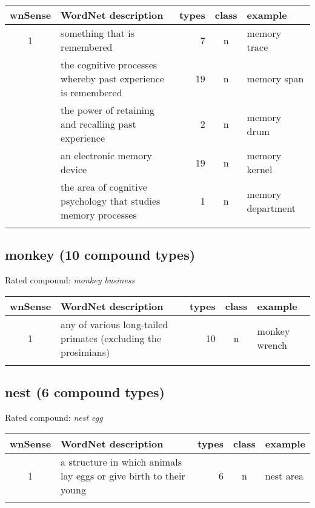 \noindent
\begin{longtable}{c>{\raggedright\arraybackslash}p{5cm}rc>{\raggedright\arraybackslash}p{2cm}}\lsptoprule
{\small wnSense}&WordNet description&types&class&example\\\midrule
1&something that is remembered&7&n&memory trace\\\tablevspace
2&the cognitive processes whereby past experience is
remembered&19&n&memory span\\\tablevspace
3&the power of retaining and recalling past experience&2&n&memory drum\\\tablevspace
4&an electronic memory device&19&n&memory kernel\\\tablevspace
5&the area of cognitive psychology that studies memory
processes&1&n&memory department\\\lspbottomrule
\end{longtable}

\subsection{monkey      (10 compound types)}
Rated compound: \emph{monkey business}

\vspace*{1ex}

\noindent
\begin{longtable}{c>{\raggedright\arraybackslash}p{5cm}rc>{\raggedright\arraybackslash}p{2cm}}\lsptoprule
{\small wnSense}&WordNet description&types&class&example\\\midrule
1&any of various long-tailed primates (excluding the prosimians)&10&n&monkey wrench\\\lspbottomrule
\end{longtable}

\subsection{nest         (6 compound types)}
Rated compound: \emph{nest egg}

\vspace*{-1ex}

\noindent
\begin{longtable}{c>{\raggedright\arraybackslash}p{5cm}rc>{\raggedright\arraybackslash}p{2cm}}\lsptoprule
{\small wnSense}&WordNet description&types&class&example\\\midrule
1&a structure in which animals lay eggs or give birth to their young&6&n&nest area\\\lspbottomrule
\end{longtable}
\vspace*{-.75cm}
